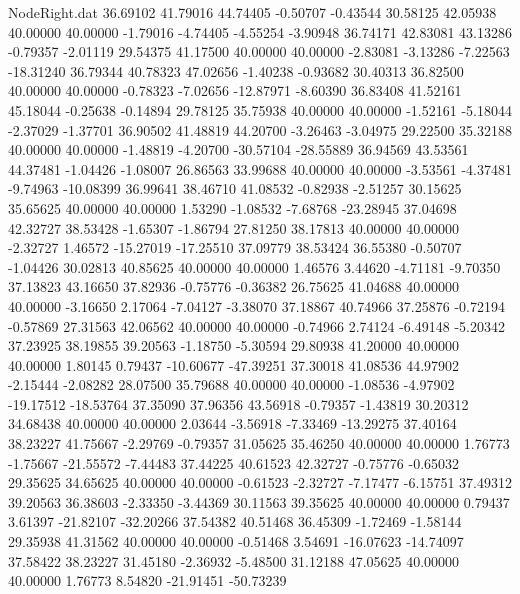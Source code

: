 \begin{filecontents}{NodeRight.dat}
  36.69102   41.79016   44.74405    -0.50707   -0.43544   30.58125   42.05938   40.00000   40.00000   -1.79016   -4.74405   -4.55254   -3.90948
  36.74171   42.83081   43.13286    -0.79357   -2.01119   29.54375   41.17500   40.00000   40.00000   -2.83081   -3.13286   -7.22563  -18.31240
  36.79344   40.78323   47.02656    -1.40238   -0.93682   30.40313   36.82500   40.00000   40.00000   -0.78323   -7.02656  -12.87971   -8.60390
  36.83408   41.52161   45.18044    -0.25638   -0.14894   29.78125   35.75938   40.00000   40.00000   -1.52161   -5.18044   -2.37029   -1.37701
  36.90502   41.48819   44.20700    -3.26463   -3.04975   29.22500   35.32188   40.00000   40.00000   -1.48819   -4.20700  -30.57104  -28.55889
  36.94569   43.53561   44.37481    -1.04426   -1.08007   26.86563   33.99688   40.00000   40.00000   -3.53561   -4.37481   -9.74963  -10.08399
  36.99641   38.46710   41.08532    -0.82938   -2.51257   30.15625   35.65625   40.00000   40.00000    1.53290   -1.08532   -7.68768  -23.28945
  37.04698   42.32727   38.53428    -1.65307   -1.86794   27.81250   38.17813   40.00000   40.00000   -2.32727    1.46572  -15.27019  -17.25510
  37.09779   38.53424   36.55380    -0.50707   -1.04426   30.02813   40.85625   40.00000   40.00000    1.46576    3.44620   -4.71181   -9.70350
  37.13823   43.16650   37.82936    -0.75776   -0.36382   26.75625   41.04688   40.00000   40.00000   -3.16650    2.17064   -7.04127   -3.38070
  37.18867   40.74966   37.25876    -0.72194   -0.57869   27.31563   42.06562   40.00000   40.00000   -0.74966    2.74124   -6.49148   -5.20342
  37.23925   38.19855   39.20563    -1.18750   -5.30594   29.80938   41.20000   40.00000   40.00000    1.80145    0.79437  -10.60677  -47.39251
  37.30018   41.08536   44.97902    -2.15444   -2.08282   28.07500   35.79688   40.00000   40.00000   -1.08536   -4.97902  -19.17512  -18.53764
  37.35090   37.96356   43.56918    -0.79357   -1.43819   30.20312   34.68438   40.00000   40.00000    2.03644   -3.56918   -7.33469  -13.29275
  37.40164   38.23227   41.75667    -2.29769   -0.79357   31.05625   35.46250   40.00000   40.00000    1.76773   -1.75667  -21.55572   -7.44483
  37.44225   40.61523   42.32727    -0.75776   -0.65032   29.35625   34.65625   40.00000   40.00000   -0.61523   -2.32727   -7.17477   -6.15751
  37.49312   39.20563   36.38603    -2.33350   -3.44369   30.11563   39.35625   40.00000   40.00000    0.79437    3.61397  -21.82107  -32.20266
  37.54382   40.51468   36.45309    -1.72469   -1.58144   29.35938   41.31562   40.00000   40.00000   -0.51468    3.54691  -16.07623  -14.74097
  37.58422   38.23227   31.45180    -2.36932   -5.48500   31.12188   47.05625   40.00000   40.00000    1.76773    8.54820  -21.91451  -50.73239

\end{filecontents}
